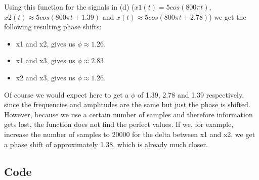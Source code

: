 \documentclass{article}
\begin{document}
Using this function for the signals in (d) ($x1(t) = 5cos(800 \pi t)$, $x2(t) \approx 5cos(800 \pi t + 1.39)$ and $x(t) \approx 5cos(800 \pi t + 2.78)$)
we get the following resulting phase shifts:
\begin{itemize}
 \item x1 and x2, gives us $\phi \approx 1.26$.
 \item x1 and x3, gives us $\phi \approx 2.83$.
 \item x2 and x3, gives us $\phi \approx 1.26$.
\end{itemize}
Of course we would expect here to get a $\phi$ of 1.39, 2.78 and 1.39 respectively, since the frequencies and amplitudes are the same
but just the phase is shifted. However, because we use a certain number of samples and therefore information gets lost,
the function does not find the perfect values. If we, for example, increase the number of samples to 20000 for the delta between
x1 and x2, we get a phase shift of approximately 1.38, which is already much closer.


\subsection{}


\begin{appendices}
\section{Code}






\end{appendices}
\end{document}
